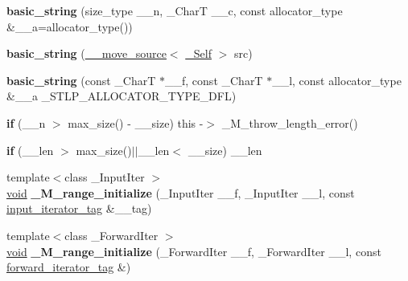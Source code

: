 \begin{DoxyCompactItemize}
{\bfseries basic\+\_\+string} (size\+\_\+type \+\_\+\+\_\+n, \+\_\+\+CharT \+\_\+\+\_\+c, const allocator\+\_\+type \&\+\_\+\+\_\+a=allocator\+\_\+type())
\item 
\mbox{\label{classbasic__string_ac7f34f525783b3b74c1c17bf27838667}} 
{\bfseries basic\+\_\+string} (\hyperlink{class____move__source}{\+\_\+\+\_\+move\+\_\+source}$<$ \hyperlink{classbasic__string}{\+\_\+\+Self} $>$ src)
\item 
\mbox{\label{classbasic__string_a789e93930822b831cb40233000e1b7cc}} 
{\bfseries basic\+\_\+string} (const \+\_\+\+CharT $\ast$\+\_\+\+\_\+f, const \+\_\+\+CharT $\ast$\+\_\+\+\_\+l, const allocator\+\_\+type \&\+\_\+\+\_\+a \+\_\+\+S\+T\+L\+P\+\_\+\+A\+L\+L\+O\+C\+A\+T\+O\+R\+\_\+\+T\+Y\+P\+E\+\_\+\+D\+FL)
\item 
\mbox{\label{classbasic__string_ad4f7917d5a969ecc2e76c03abfcb616a}} 
{\bfseries if} (\+\_\+\+\_\+n $>$ max\+\_\+size() -\/ \+\_\+\+\_\+size) this -\/$>$ \+\_\+\+M\+\_\+throw\+\_\+length\+\_\+error()
\item 
\mbox{\label{classbasic__string_adccb83ea90f7d149e340d759a777bc04}} 
{\bfseries if} (\+\_\+\+\_\+len $>$ max\+\_\+size()$\vert$$\vert$\+\_\+\+\_\+len$<$ \+\_\+\+\_\+size) \+\_\+\+\_\+len
\item 
\mbox{\label{classbasic__string_adfb1ea5fdf76918515d9ac80e806f73c}} 
{\footnotesize template$<$class \+\_\+\+Input\+Iter $>$ }\\\hyperlink{interfacevoid}{void} {\bfseries \+\_\+\+M\+\_\+range\+\_\+initialize} (\+\_\+\+Input\+Iter \+\_\+\+\_\+f, \+\_\+\+Input\+Iter \+\_\+\+\_\+l, const \hyperlink{structinput__iterator__tag}{input\+\_\+iterator\+\_\+tag} \&\+\_\+\+\_\+tag)
\item 
\mbox{\label{classbasic__string_ae427cac8f82332e350ea2245add58bd5}} 
{\footnotesize template$<$class \+\_\+\+Forward\+Iter $>$ }\\\hyperlink{interfacevoid}{void} {\bfseries \+\_\+\+M\+\_\+range\+\_\+initialize} (\+\_\+\+Forward\+Iter \+\_\+\+\_\+f, \+\_\+\+Forward\+Iter \+\_\+\+\_\+l, const \hyperlink{structforward__iterator__tag}{forward\+\_\+iterator\+\_\+tag} \&)
\item 
$$
\end{DoxyCompactItemize}
